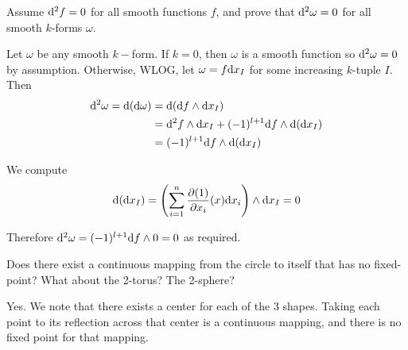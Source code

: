 \documentclass[a4paper, 12pt]{article}
\begin{document}
\begin{problem} 
Assume $\mathrm{d}^2 f = 0$ for all smooth functions $f$, and prove that $\mathrm{d}^2 \omega = 0$ for all smooth $k$-forms $\omega$.
\end{problem}
\begin{solution}
    Let $\omega$ be any smooth $k-$form. If $k = 0$, then $\omega$ is a smooth function so $\mathrm{d}^2 \omega = 0$ by assumption. Otherwise, WLOG, let $\omega = f \mathrm{d} x_I$ for some increasing $k$-tuple $I$. Then 
    \begin{align*}
        \mathrm{d}^2 \omega = \mathrm{d} (\mathrm{d} \omega) &= \mathrm{d} (\mathrm{d} f \wedge \mathrm{d} x_I) \\
        &= \mathrm{d}^2 f  \wedge \mathrm{d} x_I + (-1)^{l+1} \mathrm{d} f \wedge \mathrm{d} (\mathrm{d} x_I) \\
        &= (-1)^{l+1} \mathrm{d} f \wedge \mathrm{d} (\mathrm{d} x_I)
    \end{align*}

    We compute \begin{equation*}
        \mathrm{d} (\mathrm{d} x_I) = \left(\sum_{i=1}^{n} \frac{\partial (1)}{\partial x_i}(x) \mathrm{d} x_i\right) \wedge \mathrm{d} x_I = 0
    \end{equation*}

    Therefore $\mathrm{d}^2 \omega = (-1)^{l+1} \mathrm{d} f \wedge 0 = 0$ as required.
\end{solution}

\begin{problem} 
Does there exist a continuous mapping from the circle to itself that has no fixed-point? What about the 2-torus? The 2-sphere?
\end{problem}
\begin{solution}
    Yes. We note that there exists a center for each of the 3 shapes. Taking each point to its reflection across that center is a continuous mapping, and there is no fixed point for that mapping.
\end{solution}
\end{document}
